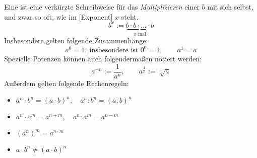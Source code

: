 Eine  ist eine verkürzte Schreibweise für das \textit{Multiplizieren} einer  $b$ mit sich selbst, und zwar so oft, wie im [Exponent] $x$ steht.
$$b^x := \underbrace{b \cdot b \cdot \dots \cdot b}_\text{$x$ mal}$$
Insbesondere gelten folgende Zusammenhänge:
$$a^0 = 1, \ \text{insbesondere ist $0^0 = 1$}, \qquad a^1 = a$$
Spezielle Potenzen können auch folgendermaßen notiert werden:
$$a^{-n} := \frac{1}{a^n}, \qquad a^{\frac{1}{n}} := \sqrt[n]{a}$$
Außerdem gelten folgende Rechenregeln:
\begin{itemize}
    \item $a^n \cdot b^n = (a \cdot b)^n, \quad a^n : b^n = (a : b)^n$
    \item $a^n \cdot a^m = a^{n+m}, \quad a^n : a^m = a^{n-m}$
    \item $(a^n)^m = a^{n \cdot m}$
    \item $a \cdot b^n \neq (a \cdot b)^n$
\end{itemize}